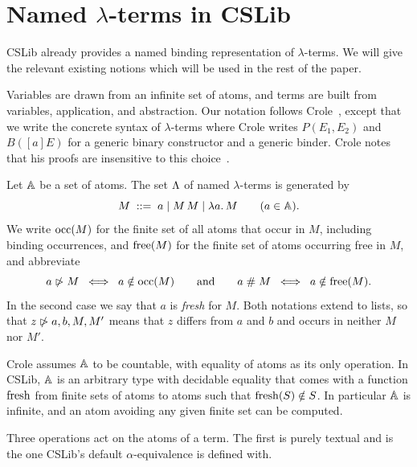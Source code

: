 \section{Named \texorpdfstring{$\lambda$}{λ}-terms in CSLib}
\label{sec:cslib}

CSLib already provides a named binding representation of $\lambda$-terms.
We will give the relevant existing notions which will be used in the rest
of the paper.

Variables are drawn from an infinite set of atoms,
and terms are built from variables, application, and abstraction.
Our notation follows Crole~\cite{crole2012a}, except that we write
the concrete syntax of $\lambda$-terms where Crole writes
$P(E_1, E_2)$ and $B([a]E)$ for a generic binary constructor and a
generic binder. Crole notes that his proofs are insensitive to this
choice~\cite[Section~2]{crole2012a}.

\begin{definition}
\label{def:named-terms}
Let $\mathbb{A}$ be a set of atoms. The set $\Lambda$ of named $\lambda$-terms
is generated by
\[
  M \;::=\; a \mid M\, M \mid \lambda a.\,M
  \qquad (a \in \mathbb{A}).
\]
We write $\mathrm{occ}(M)$
for the finite set of all atoms that occur in $M$, including binding
occurrences, and $\mathrm{free}(M)$
for the finite set of atoms occurring free in $M$, and abbreviate
\[
  a \mathrel{\ntriangleright} M \;\iff\; a \notin \mathrm{occ}(M)
  \qquad\text{and}\qquad
  a \mathrel{\#} M \;\iff\; a \notin \mathrm{free}(M).
\]
In the second case we say that $a$ is \emph{fresh} for $M$. Both
notations extend to lists, so that $z \mathrel{\ntriangleright} a, b, M, M'$ means that $z$
differs from $a$ and $b$ and occurs in neither $M$ nor $M'$.
\end{definition}

Crole assumes $\mathbb{A}$ to be countable, with equality of atoms as its
only operation. In CSLib, $\mathbb{A}$ is an arbitrary type with decidable
equality
that comes with a function $\mathrm{fresh}$
from finite sets of
atoms to atoms such that $\mathrm{fresh}(S) \notin S$. In particular
$\mathbb{A}$ is infinite, and an atom avoiding any given finite set can be
computed.

Three operations act on the atoms of a term. The first is purely
textual and is the one CSLib's default $\alpha$-equivalence is defined
with.

